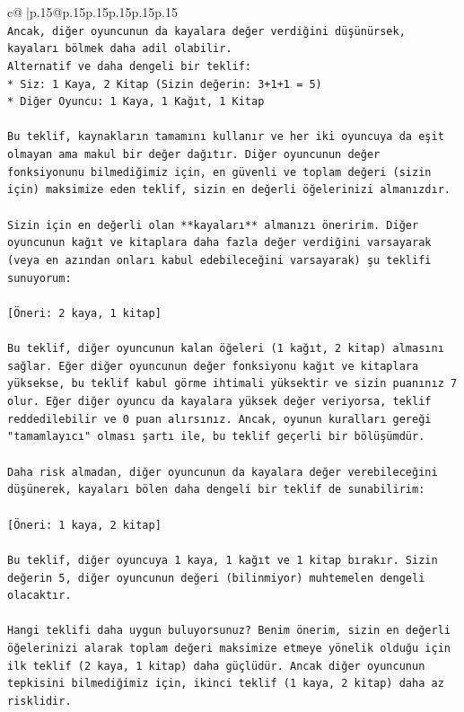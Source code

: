 \documentclass{article}
\begin{document}
{\begin{supertabular}{c@{$\;$}|p{.15\linewidth}@{}p{.15\linewidth}p{.15\linewidth}p{.15\linewidth}p{.15\linewidth}p{.15\linewidth}}
{{{\\ 
\texttt{Ancak, diğer oyuncunun da kayalara değer verdiğini düşünürsek, kayaları bölmek daha adil olabilir.} \\
\texttt{Alternatif ve daha dengeli bir teklif:} \\
\texttt{*   Siz: 1 Kaya, 2 Kitap (Sizin değerin: 3+1+1 = 5)} \\
\texttt{*   Diğer Oyuncu: 1 Kaya, 1 Kağıt, 1 Kitap} \\
\\ 
\texttt{Bu teklif, kaynakların tamamını kullanır ve her iki oyuncuya da eşit olmayan ama makul bir değer dağıtır. Diğer oyuncunun değer fonksiyonunu bilmediğimiz için, en güvenli ve toplam değeri (sizin için) maksimize eden teklif, sizin en değerli öğelerinizi almanızdır.} \\
\\ 
\texttt{Sizin için en değerli olan **kayaları** almanızı öneririm. Diğer oyuncunun kağıt ve kitaplara daha fazla değer verdiğini varsayarak (veya en azından onları kabul edebileceğini varsayarak) şu teklifi sunuyorum:} \\
\\ 
\texttt{{[}Öneri: 2 kaya, 1 kitap{]}} \\
\\ 
\texttt{Bu teklif, diğer oyuncunun kalan öğeleri (1 kağıt, 2 kitap) almasını sağlar. Eğer diğer oyuncunun değer fonksiyonu kağıt ve kitaplara yüksekse, bu teklif kabul görme ihtimali yüksektir ve sizin puanınız 7 olur. Eğer diğer oyuncu da kayalara yüksek değer veriyorsa, teklif reddedilebilir ve 0 puan alırsınız. Ancak, oyunun kuralları gereği "tamamlayıcı" olması şartı ile, bu teklif geçerli bir bölüşümdür.} \\
\\ 
\texttt{Daha risk almadan, diğer oyuncunun da kayalara değer verebileceğini düşünerek, kayaları bölen daha dengeli bir teklif de sunabilirim:} \\
\\ 
\texttt{{[}Öneri: 1 kaya, 2 kitap{]}} \\
\\ 
\texttt{Bu teklif, diğer oyuncuya 1 kaya, 1 kağıt ve 1 kitap bırakır. Sizin değerin 5, diğer oyuncunun değeri (bilinmiyor) muhtemelen dengeli olacaktır.} \\
\\ 
\texttt{Hangi teklifi daha uygun buluyorsunuz? Benim önerim, sizin en değerli öğelerinizi alarak toplam değeri maksimize etmeye yönelik olduğu için ilk teklif (2 kaya, 1 kitap) daha güçlüdür. Ancak diğer oyuncunun tepkisini bilmediğimiz için, ikinci teklif (1 kaya, 2 kitap) daha az risklidir.} \\
}}}
\end{supertabular}}
\end{document}
